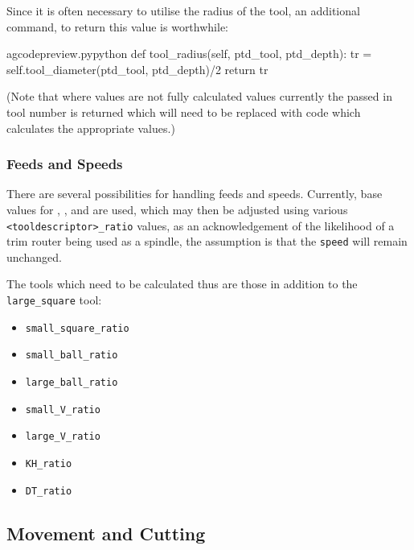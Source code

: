 \documentclass{ltxdoc}
\begin{document}
Since it is often necessary to utilise the radius of the tool, an additional command,  to return this value is worthwhile:
 
\lstset{firstnumber=\thegcpy}
\begin{writecode}{a}{gcodepreview.py}{python}
    def tool_radius(self, ptd_tool, ptd_depth):
        tr = self.tool_diameter(ptd_tool, ptd_depth)/2
        return tr

\end{writecode}
\addtocounter{gcpy}{4}
 
\noindent (Note that where values are not fully calculated values currently the passed in tool number is returned which will need to be replaced with code which calculates the appropriate values.)

\subsubsection{Feeds and Speeds}

There are several possibilities for handling feeds and speeds. Currently, base values for , , and  are used, which may then be adjusted using various \verb|<tooldescriptor>_ratio| values, as an acknowledgement of the likelihood of a trim router being used as a spindle, the assumption is that the \texttt{speed} will remain unchanged.


The tools which need to be calculated thus are those in addition to the \verb|large_square| tool:

\begin{itemize}
\item \verb|small_square_ratio|
\item \verb|small_ball_ratio|
\item \verb|large_ball_ratio|
\item \verb|small_V_ratio|
\item \verb|large_V_ratio|
\item \verb|KH_ratio|
\item \verb|DT_ratio|
\end{itemize}

\subsection{Movement and Cutting}
\end{document}
